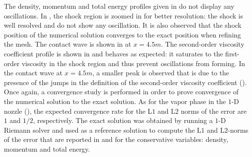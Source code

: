  The density, momentum and total energy profiles given in  do not display any oscillations. In , the shock region is zoomed in for better resolution: the shock is well resolved and do not show any oscillation. It is also observed that the shock position of the numerical solution converges to the exact position when refining the mesh. The contact wave is shown in  at $x=4.5m$. The second-order viscosity coefficient profile is shown in  and behaves as expected: it saturates to the first-order viscosity in the shock region and thus prevent oscillations from forming. In the contact wave at $x=4.5m$, a smaller peak is observed that is due to the presence of the jumps in the definition of the second-order viscosity coefficient ().  \\
Once again, a convergence study is performed in order to prove convergence of the numerical solution to the exact solution. As for the vapor phase in the $1$-D nozzle (), the expected convergence rate for the L$1$ and L$2$ norms of the error are $1$ and $1/2$, respectively. The exact solution was obtained by running a $1$-D Riemann solver and used as a reference solution to compute the L$1$ and L$2$-norms of the error that are reported in  and  for the conservative variables: density, momentum and total energy.
